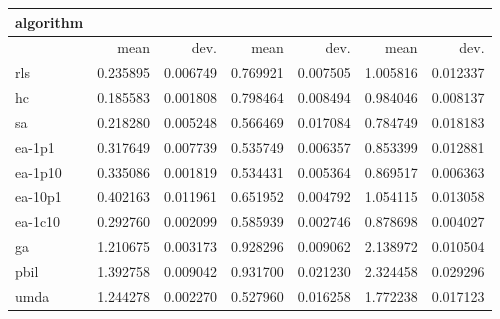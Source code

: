 \begin{tabular}{@{}l*{6}{>{{}}N{1}{2}}@{}}
\toprule
{algorithm} &  &  &  \\
\midrule
& {mean} & {dev.} & {mean} & {dev.} & {mean} & {dev.} \\
\midrule
rls & 0.235895 & 0.006749 & 0.769921 & 0.007505 & 1.005816 & 0.012337 \\
 hc & 0.185583 & 0.001808 & 0.798464 & 0.008494 & 0.984046 & 0.008137 \\
 sa & 0.218280 & 0.005248 & 0.566469 & 0.017084 & 0.784749 & 0.018183 \\
 ea-1p1 & 0.317649 & 0.007739 & 0.535749 & 0.006357 & 0.853399 & 0.012881 \\
 ea-1p10 & 0.335086 & 0.001819 & 0.534431 & 0.005364 & 0.869517 & 0.006363 \\
 ea-10p1 & 0.402163 & 0.011961 & 0.651952 & 0.004792 & 1.054115 & 0.013058 \\
 ea-1c10 & 0.292760 & 0.002099 & 0.585939 & 0.002746 & 0.878698 & 0.004027 \\
 ga & 1.210675 & 0.003173 & 0.928296 & 0.009062 & 2.138972 & 0.010504 \\
 pbil & 1.392758 & 0.009042 & 0.931700 & 0.021230 & 2.324458 & 0.029296 \\
 umda & 1.244278 & 0.002270 & 0.527960 & 0.016258 & 1.772238 & 0.017123 \\
 \bottomrule
\end{tabular}
